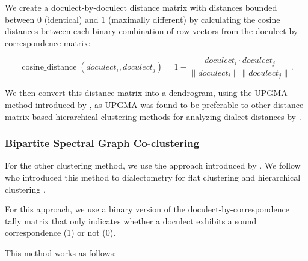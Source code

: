 \documentclass[a4paper]{article}
\begin{document}

We create a doculect-by-doculect distance matrix
with distances bounded between $0$ (identical) and $1$ (maximally different)
by calculating the cosine distances between each
binary combination of row vectors from the doculect-by-correspondence matrix:

\begin{equation*}
\operatorname{cosine\_distance}(doculect_i,doculect_j) =
1 -
\frac{doculect_i \cdot doculect_j}{\lVert doculect_i \rVert \lVert doculect_j \rVert}
.
\end{equation*}

We then convert this distance matrix into a dendrogram,
using the UPGMA method introduced by \citet{sokal1958statistical},
as UPGMA was found to be preferable to other
distance matrix-based hierarchical clustering methods
for analyzing dialect distances by \citet{heeringa2004measuring}.


\subsubsection{Bipartite Spectral Graph Co-clustering}

For the other clustering method, we use the approach
introduced by \citet{dhillon2001co-clustering}.
We follow \citeauthor*{wieling2009bipartite} who introduced
this method to dialectometry for flat clustering \citeyearpar{wieling2009bipartite} and hierarchical clustering \citeyearpar{wieling2010hierarchical}.

For this approach, we use a binary version of the
doculect-by-correspondence tally matrix that only
indicates whether a doculect exhibits
a sound correspondence ($1$) or not ($0$).

This method works as follows:
\end{document}
